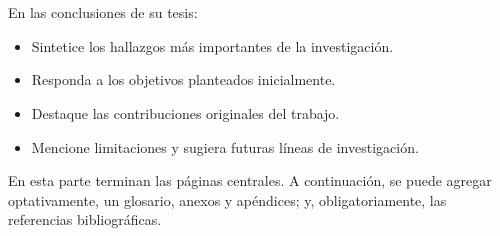 \chapter*{\conclusionsname}%
\label{cap:concl}%
%

En las conclusiones de su tesis:%
\begin{itemize}
	\item Sintetice los hallazgos más importantes de la investigación.%
	\item Responda a los objetivos planteados inicialmente.%
	\item Destaque las contribuciones originales del trabajo.%
	\item Mencione limitaciones y sugiera futuras líneas de investigación.%
\end{itemize}

En esta parte terminan las páginas centrales. A continuación, se puede agregar optativamente, un glosario, anexos y apéndices; y, obligatoriamente, las referencias bibliográficas.\par%